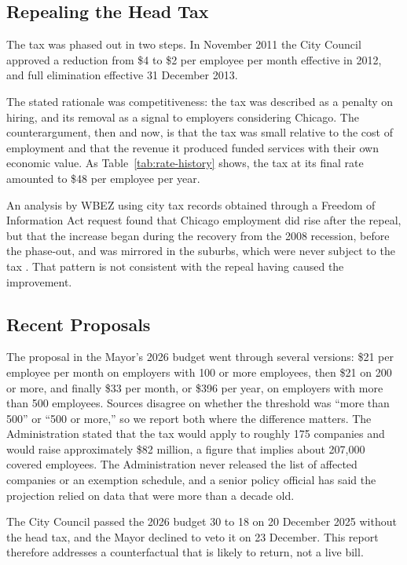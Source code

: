 \documentclass[12pt,letterpaper]{article}
\newif\ifdraft
\newcommand{\NEEDSRC}{\ifdraft\textsuperscript{\textcolor{red}{[src]}}\fi}
\begin{document}
\subsection{Repealing the Head Tax}

The tax was phased out in two steps. In November 2011 the City Council approved a reduction from \$4 to \$2 per employee per month effective in 2012, and full elimination effective 31 December 2013.

The stated rationale was competitiveness: the tax was described as a penalty on hiring, and its removal as a signal to employers considering Chicago. The counterargument, then and now, is that the tax was small relative to the cost of employment and that the revenue it produced funded services with their own economic value. As Table~\ref{tab:rate-history} shows, the tax at its final rate amounted to \$48 per employee per year.

An analysis by WBEZ using city tax records obtained through a Freedom of Information Act request found that Chicago employment did rise after the repeal, but that the increase began during the recovery from the 2008 recession, before the phase-out, and was mirrored in the suburbs, which were never subject to the tax \citep{woelfel2025}. That pattern is not consistent with the repeal having caused the improvement.

\subsection{Recent Proposals}

The proposal in the Mayor's 2026 budget went through several versions: \$21 per employee per month on employers with 100 or more employees, then \$21 on 200 or more, and finally \$33 per month, or \$396 per year, on employers with more than 500 employees.\NEEDSRC{} Sources disagree on whether the threshold was ``more than 500'' or ``500 or more,'' so we report both where the difference matters. The Administration stated that the tax would apply to roughly 175 companies and would raise approximately \$82 million, a figure that implies about 207,000 covered employees. The Administration never released the list of affected companies or an exemption schedule, and a senior policy official has said the projection relied on data that were more than a decade old.\NEEDSRC{}

The City Council passed the 2026 budget 30 to 18 on 20 December 2025 without the head tax, and the Mayor declined to veto it on 23 December.\NEEDSRC{} This report therefore addresses a counterfactual that is likely to return, not a live bill.
\end{document}
